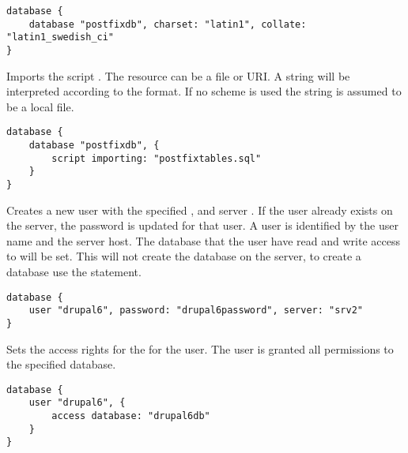 \begin{lstlisting}[style=Java]
database {
    database "postfixdb", charset: "latin1", collate: "latin1_swedish_ci"
}
\end{lstlisting}


Imports the script . The resource can be a file or URI. 
A string will be interpreted according to the format. If no scheme is used 
the string is assumed to be a local file.

\begin{lstlisting}[style=Java]
database {
    database "postfixdb", {
        script importing: "postfixtables.sql"
    }
}
\end{lstlisting}


Creates a new user with the specified ,  and server .
If the user already exists on the server, the password is updated for that user.
A user is identified by the user name and the server host.
The database that the user have read and write access to will be set. This will not create
the database on the server, to create a database use the  statement.

\begin{lstlisting}[style=Java]
database {
    user "drupal6", password: "drupal6password", server: "srv2"
}
\end{lstlisting}


Sets the access rights for the  for the user. The user is granted 
all permissions to the specified database.

\begin{lstlisting}[style=Java]
database {
    user "drupal6", {
        access database: "drupal6db"
    }
}
\end{lstlisting}

